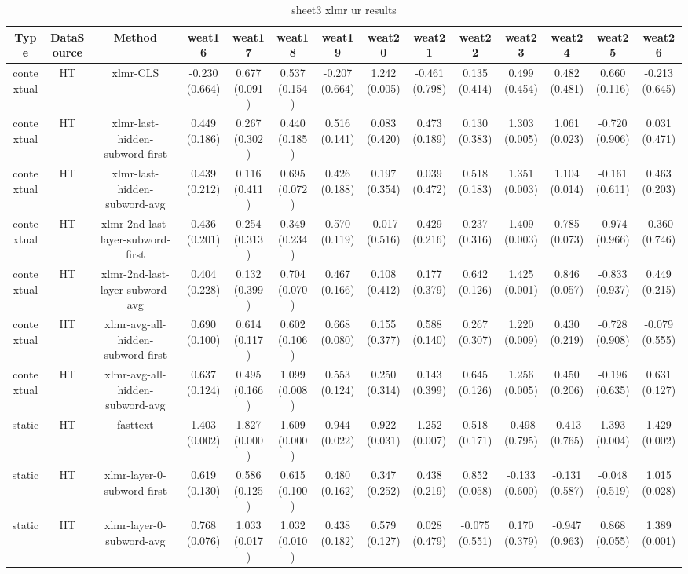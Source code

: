\begin{sidewaystable}[htb]
    \centering
    \caption{sheet3 xlmr ur results}
    \label{appendix_tab:sheet3_xlmr_ur_results}
    \small
    \begin{tabular}{@{}cccccccccccccc@{}}
        \toprule
        Type & DataSource & Method & weat16 & weat17 & weat18 & weat19 & weat20 & weat21 & weat22 & weat23 & weat24 & weat25 & weat26 \\
        \midrule
        contextual & HT & xlmr-CLS & -0.230 (0.664) & 0.677 (0.091) & 0.537 (0.154) & -0.207 (0.664) & 1.242 (0.005) & -0.461 (0.798) & 0.135 (0.414) & 0.499 (0.454) & 0.482 (0.481) & 0.660 (0.116) & -0.213 (0.645) \\
        contextual & HT & xlmr-last-hidden-subword-first & 0.449 (0.186) & 0.267 (0.302) & 0.440 (0.185) & 0.516 (0.141) & 0.083 (0.420) & 0.473 (0.189) & 0.130 (0.383) & 1.303 (0.005) & 1.061 (0.023) & -0.720 (0.906) & 0.031 (0.471) \\
        contextual & HT & xlmr-last-hidden-subword-avg & 0.439 (0.212) & 0.116 (0.411) & 0.695 (0.072) & 0.426 (0.188) & 0.197 (0.354) & 0.039 (0.472) & 0.518 (0.183) & 1.351 (0.003) & 1.104 (0.014) & -0.161 (0.611) & 0.463 (0.203) \\
        contextual & HT & xlmr-2nd-last-layer-subword-first & 0.436 (0.201) & 0.254 (0.313) & 0.349 (0.234) & 0.570 (0.119) & -0.017 (0.516) & 0.429 (0.216) & 0.237 (0.316) & 1.409 (0.003) & 0.785 (0.073) & -0.974 (0.966) & -0.360 (0.746) \\
        contextual & HT & xlmr-2nd-last-layer-subword-avg & 0.404 (0.228) & 0.132 (0.399) & 0.704 (0.070) & 0.467 (0.166) & 0.108 (0.412) & 0.177 (0.379) & 0.642 (0.126) & 1.425 (0.001) & 0.846 (0.057) & -0.833 (0.937) & 0.449 (0.215) \\
        contextual & HT & xlmr-avg-all-hidden-subword-first & 0.690 (0.100) & 0.614 (0.117) & 0.602 (0.106) & 0.668 (0.080) & 0.155 (0.377) & 0.588 (0.140) & 0.267 (0.307) & 1.220 (0.009) & 0.430 (0.219) & -0.728 (0.908) & -0.079 (0.555) \\
        contextual & HT & xlmr-avg-all-hidden-subword-avg & 0.637 (0.124) & 0.495 (0.166) & 1.099 (0.008) & 0.553 (0.124) & 0.250 (0.314) & 0.143 (0.399) & 0.645 (0.126) & 1.256 (0.005) & 0.450 (0.206) & -0.196 (0.635) & 0.631 (0.127) \\
        static & HT & fasttext & 1.403 (0.002) & 1.827 (0.000) & 1.609 (0.000) & 0.944 (0.022) & 0.922 (0.031) & 1.252 (0.007) & 0.518 (0.171) & -0.498 (0.795) & -0.413 (0.765) & 1.393 (0.004) & 1.429 (0.002) \\
        static & HT & xlmr-layer-0-subword-first & 0.619 (0.130) & 0.586 (0.125) & 0.615 (0.100) & 0.480 (0.162) & 0.347 (0.252) & 0.438 (0.219) & 0.852 (0.058) & -0.133 (0.600) & -0.131 (0.587) & -0.048 (0.519) & 1.015 (0.028) \\
        static & HT & xlmr-layer-0-subword-avg & 0.768 (0.076) & 1.033 (0.017) & 1.032 (0.010) & 0.438 (0.182) & 0.579 (0.127) & 0.028 (0.479) & -0.075 (0.551) & 0.170 (0.379) & -0.947 (0.963) & 0.868 (0.055) & 1.389 (0.001) \\
        \bottomrule
    \end{tabular}
\end{sidewaystable}